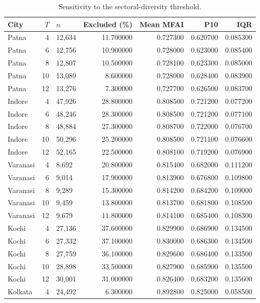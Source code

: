 \begin{table}[htbp]
\centering
\small
\caption{Sensitivity to the sectoral-diversity threshold.}
\label{tab:s1_threshold}
\begin{tabular}{lrlrrrr}
\toprule
City & $T$ & $n$ & Excluded (\%) & Mean MFAI & P10 & IQR \\
\midrule
Patna & 4 & 12,634 & 11.700000 & 0.727300 & 0.620700 & 0.085300 \\
Patna & 6 & 12,756 & 10.900000 & 0.728000 & 0.623000 & 0.085400 \\
Patna & 8 & 12,807 & 10.500000 & 0.728100 & 0.623300 & 0.085000 \\
Patna & 10 & 13,089 & 8.600000 & 0.728000 & 0.628400 & 0.083900 \\
Patna & 12 & 13,276 & 7.300000 & 0.727700 & 0.626500 & 0.083700 \\
Indore & 4 & 47,926 & 28.800000 & 0.808500 & 0.721200 & 0.077200 \\
Indore & 6 & 48,246 & 28.300000 & 0.808500 & 0.721200 & 0.077100 \\
Indore & 8 & 48,884 & 27.300000 & 0.808700 & 0.722000 & 0.076700 \\
Indore & 10 & 50,296 & 25.200000 & 0.808500 & 0.721100 & 0.076600 \\
Indore & 12 & 52,165 & 22.500000 & 0.808100 & 0.719200 & 0.076900 \\
Varanasi & 4 & 8,692 & 20.800000 & 0.815400 & 0.682000 & 0.111200 \\
Varanasi & 6 & 9,014 & 17.900000 & 0.813900 & 0.676800 & 0.109800 \\
Varanasi & 8 & 9,289 & 15.300000 & 0.814200 & 0.684200 & 0.109000 \\
Varanasi & 10 & 9,459 & 13.800000 & 0.813700 & 0.681800 & 0.108500 \\
Varanasi & 12 & 9,679 & 11.800000 & 0.814100 & 0.685400 & 0.108300 \\
Kochi & 4 & 27,136 & 37.600000 & 0.829900 & 0.686900 & 0.134500 \\
Kochi & 6 & 27,332 & 37.100000 & 0.830000 & 0.686300 & 0.134500 \\
Kochi & 8 & 27,759 & 36.100000 & 0.829600 & 0.686400 & 0.133500 \\
Kochi & 10 & 28,898 & 33.500000 & 0.827900 & 0.685900 & 0.135500 \\
Kochi & 12 & 30,001 & 31.000000 & 0.826400 & 0.683200 & 0.135600 \\
Kolkata & 4 & 24,492 & 6.300000 & 0.892800 & 0.825000 & 0.058500 \\

\end{tabular}
\end{table}
